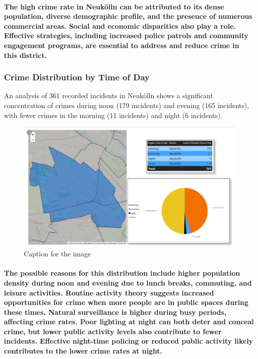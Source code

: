 \paragraph{The high crime rate in Neukölln can be attributed to its dense population, diverse demographic profile, and the presence of numerous commercial areas. Social and economic disparities also play a role. Effective strategies, including increased police patrols and community engagement programs, are essential to address and reduce crime in this district.}

\subsubsection{Crime Distribution by Time of Day}
An analysis of 361 recorded incidents in Neukölln shows a significant concentration of crimes during noon (179 incidents) and evening (165 incidents), with fewer crimes in the morning (11 incidents) and night (6 incidents).

\begin{figure}[h]
\includegraphics[width=\textwidth]{./figures/intro_rishabh/1_3.jpg}
    \caption{Caption for the image}
    \label{fig:districts}
\end{figure}

\paragraph{The possible reasons for this distribution include higher population density during noon and evening due to lunch breaks, commuting, and leisure activities. Routine activity theory suggests increased opportunities for crime when more people are in public spaces during these times. Natural surveillance is higher during busy periods, affecting crime rates. Poor lighting at night can both deter and conceal crime, but lower public activity levels also contribute to fewer incidents. Effective night-time policing or reduced public activity likely contributes to the lower crime rates at night.
}



